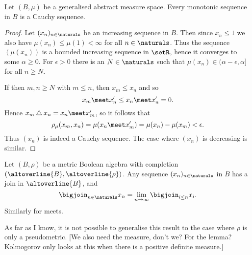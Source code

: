 \documentclass[article, a4paper, 11pt, oneside]{memoir}
\numberwithin{equation}{chapter}
\renewcommand{\symdiff}{\mathbin{\triangle}}
\begin{document}
\begin{lemma}
    \label{thm:monotonic-sequence-Cauchy}
    Let $(B,\mu)$ be a generalised abstract measure space. Every monotonic sequence in $B$ is a Cauchy sequence.
\end{lemma}

\begin{proof}
    Let $(x_n)_{n\in\naturals}$ be an increasing sequence in $B$. Then since $x_n \leq 1$ we also have $\mu(x_n) \leq \mu(1) < \infty$ for all $n \in \naturals$. Thus the sequence $(\mu(x_n))$ is a bounded increasing sequence in $\setR$, hence it converges to some $\alpha \geq 0$. For $\epsilon > 0$ there is an $N \in \naturals$ such that $\mu(x_n) \in (\alpha - \epsilon, \alpha]$ for all $n \geq N$.
    
    If then $m,n \geq N$ with $m \leq n$, then $x_m \leq x_n$ and so
    \begin{equation*}
        x_m \meet x_n'
            \leq x_n \meet x_n'
            = 0.
    \end{equation*}
    Hence $x_m \symdiff x_n = x_n \meet x_m'$, so it follows that
    \begin{equation*}
        \rho_\mu(x_m,x_n)
            = \mu(x_n \meet x_m')
            = \mu(x_n) - \mu(x_m)
            < \epsilon.
    \end{equation*}
    Thus $(x_n)$ is indeed a Cauchy sequence. The case where $(x_n)$ is decreasing is similar.
\end{proof}


\begin{proposition}
    \label{thm:existence-of-joins}
    Let $(B,\rho)$ be a metric Boolean algebra with completion $(\altoverline{B}, \altoverline{\rho})$. Any sequence $(x_n)_{n\in\naturals}$ in $B$ has a join in $\altoverline{B}$, and
    \begin{equation*}
        \bigjoin_{n\in\naturals} x_n
            = \lim_{n\to\infty} \bigjoin_{i \leq n} x_i.
    \end{equation*}
    Similarly for meets.
\end{proposition}
%
As far as I know, it is not possible to generalise this result to the case where $\rho$ is only a pseudometric. [We also need the measure, don't we? For the lemma? Kolmogorov only looks at this when there is a positive definite measure.]
\end{document}

